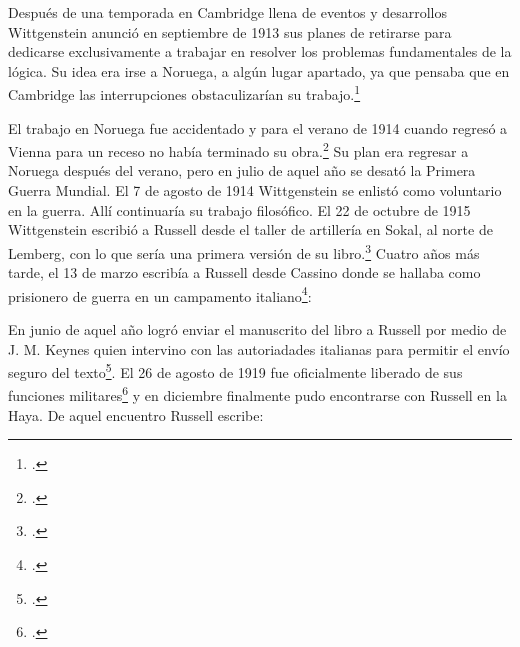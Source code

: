 Después de una temporada en Cambridge llena de eventos y desarrollos
Wittgenstein anunció en septiembre de 1913 sus planes de retirarse para
dedicarse exclusivamente a trabajar en resolver los problemas fundamentales de
la lógica. Su idea era irse a Noruega, a algún lugar apartado, ya que pensaba
que en Cambridge las interrupciones obstaculizarían su trabajo.\footcite[cap. 4
loc 1844]{monk} 

El trabajo en Noruega fue accidentado y para el verano de 1914 cuando regresó a
Vienna para un receso no había terminado su obra.\footcite[cap. 5 loc
2154]{monk} Su plan era regresar a Noruega después del verano, pero en julio de
aquel año se desató la Primera Guerra Mundial. El 7 de agosto de 1914
Wittgenstein se enlistó como voluntario en la guerra. Allí continuaría su 
trabajo filosófico. El 22 de octubre de 1915 Wittgenstein escribió a Russell
desde el taller de artillería en Sokal, al norte de Lemberg, con lo que sería
una primera versión de su libro.\footcite[cf. p.84]{cambridgeletters} Cuatro años más
tarde, el 13 de marzo escribía a Russell desde Cassino donde se hallaba como
prisionero de guerra en un campamento italiano\footcite[cf. p.268]{mcguinness}:

En junio de aquel año logró enviar el manuscrito del libro a Russell por medio
de J. M. Keynes quien intervino con las autoriadades italianas para permitir el
envío seguro del texto\footcite[p.90 y 91]{cambridgeletters}. El 26 de agosto
de 1919 fue oficialmente liberado de sus funciones
militares\footcite[p.277]{mcguinness} y en diciembre finalmente pudo encontrarse
con Russell en la Haya. De aquel encuentro Russell escribe:




